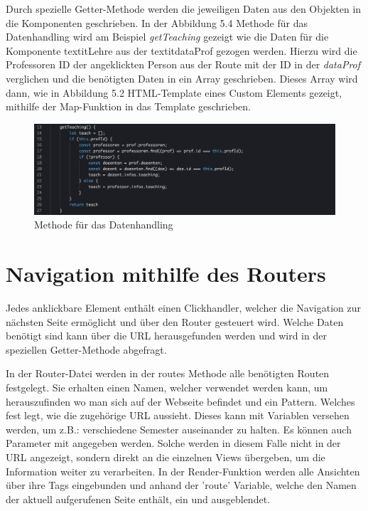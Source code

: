 \documentclass[12pt,					%
							 oneside,			%
							 a4paper,			%
							 halfparskip,		%
							 liststotoc,			%
							 bibtotoc,			%
							 fleqn,				%
							 pointlessnumbers]	%
							 {scrreprt}
\begin{document}
	Durch spezielle Getter-Methode werden die jeweiligen Daten aus den Objekten in die Komponenten geschrieben. In der Abbildung 5.4 Methode für das Datenhandling wird am Beispiel \textit{getTeaching} gezeigt wie die Daten für die Komponente textit{Lehre} aus der textit{dataProf} gezogen werden. Hierzu wird die Professoren ID der angeklickten Person aus der Route mit der ID in der \textit{dataProf} verglichen und die benötigten Daten in ein Array geschrieben. Dieses Array wird dann, wie in Abbildung 5.2 HTML-Template eines Custom Elements gezeigt, mithilfe der Map-Funktion in das Template geschrieben.
	\begin{figure}[h]
		\centering
		\includegraphics[width=1\textwidth]{pictures/getTeaching.png}
		\caption{Methode für das Datenhandling}						
		\label{getTeaching}
	\end{figure}
	
	\section{Navigation mithilfe des Routers}
	Jedes anklickbare Element enthält einen Clickhandler, welcher die Navigation zur nächsten Seite ermöglicht und über den Router gesteuert wird. Welche Daten benötigt sind kann über die URL herausgefunden werden und wird in der speziellen Getter-Methode abgefragt.	
	
	In der Router-Datei werden in der routes Methode alle benötigten Routen festgelegt.
Sie erhalten einen Namen, welcher verwendet werden kann, um herauszufinden wo man sich auf der Webseite befindet und ein Pattern. Welches fest legt, wie die zugehörige URL aussieht. Dieses kann mit Variablen versehen werden, um z.B.: verschiedene Semester auseinander zu halten. Es können auch Parameter mit angegeben werden. Solche werden in diesem Falle nicht in der URL angezeigt, sondern direkt an die einzelnen Views übergeben, um die Information weiter zu verarbeiten. In der Render-Funktion werden alle Ansichten über ihre Tags eingebunden und anhand der 'route' Variable, welche den Namen der aktuell aufgerufenen Seite enthält, ein und ausgeblendet.
\end{document}
